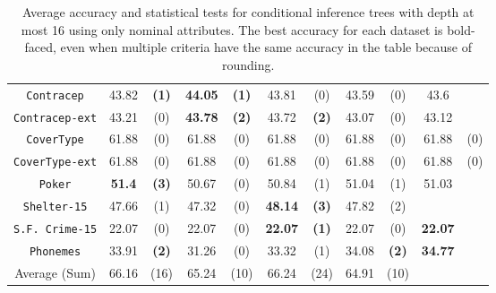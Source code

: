 \begin{table}
\begin{tabular}{c|cc|cc|cc|cc|cc}
{\tt Contracep}     & 43.82      &  {\bf (1)}        &   {\bf 44.05}& {\bf (1)}       &  43.81      &  (0)                 & 43.59       & (0)             & 43.6        &             \\
{\tt Contracep-ext} & 43.21      &  (0)              &   {\bf 43.78}& {\bf (2)}       &  43.72      &  {\bf (2)}           & 43.07       & (0)             & 43.12       &             \\
{\tt CoverType}     & 61.88      &  (0)              &   61.88      & (0)             &  61.88      &  (0)                 & 61.88       & (0)             & 61.88       & (0)         \\
{\tt CoverType-ext} & 61.88      &  (0)              &   61.88      & (0)             &  61.88      &  (0)                 & 61.88       & (0)             & 61.88       & (0)         \\
{\tt Poker}         & {\bf 51.4} &  {\bf (3)}        &   50.67      & (0)             &  50.84      &  (1)                 & 51.04       & (1)             & 51.03       &             \\
{\tt Shelter-15}    & 47.66      &  (1)              &   47.32      & (0)             & {\bf 48.14} &  {\bf (3)}           & 47.82       & (2)             &             &             \\
{\tt S.F. Crime-15} & 22.07      &  (0)              &   22.07      & (0)             & {\bf 22.07} &  {\bf (1)}           & 22.07       & (0)             & {\bf 22.07} &             \\
{\tt Phonemes}      & 33.91      &  {\bf (2)}        &   31.26      & (0)             &  33.32      &  (1)                 & 34.08       & {\bf (2)}       & {\bf 34.77} &             \\
\hline
Average (Sum)       & 66.16      &  (16)             &   65.24      & (10)            &  66.24      &  (24)                & 64.91       & (10)            &             &
       \end{tabular}
        \caption{Average accuracy and statistical tests  for  conditional inference trees 
with depth at most 16 using only nominal attributes. The best accuracy for each dataset is bold-faced, even when multiple criteria have the same accuracy in the table because of rounding.}
\label{tab:ctree-16}
\normalsize
\end{table}


